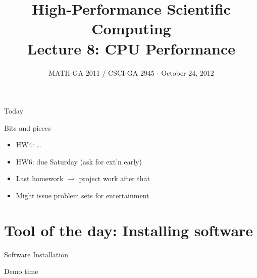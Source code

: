 \documentclass[english,compress]{beamer}
\begin{document}

\title{High-Performance Scientific Computing\\Lecture 8: CPU Performance}

\date{MATH-GA 2011 / CSCI-GA 2945 $\cdot$ October 24, 2012}

\frame{\titlepage}

\begin{frame}{Today}
  \tableofcontents[hideallsubsections]
\end{frame}
\begin{frame}{Bits and pieces}
  \begin{itemize}
    \item HW4: \dots
    \item HW6: due Saturday (ask for ext'n early)
    \item Last homework $\rightarrow$ project work after that
    \item Might issue problem sets for entertainment
  \end{itemize}
\end{frame}
\section[Software]{Tool of the day: Installing software}
\begin{frame}{Software Installation}
  \begin{center}
  \Huge Demo time
  \end{center}
\end{frame}
\end{document}
